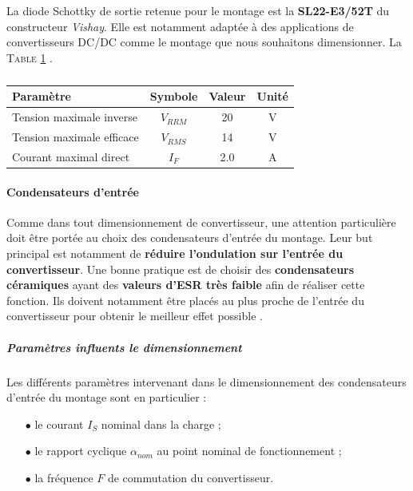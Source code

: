 				La diode Schottky de sortie retenue pour le montage est la 
				\textbf{SL22-E3/52T} du constructeur \textit{Vishay}. 
				Elle est notamment adaptée à des applications de convertisseurs
				DC/DC comme le montage que nous souhaitons dimensionner. 
				La \textsc{Table \ref{charact_schottky}} \cite{SL22}.
					
				\begin{table}
					\begin{center}
						\begin{tabular}{|l|c|c|c}
							\hline
							Paramètre & Symbole & Valeur & Unité \\
							\hline						
							Tension maximale inverse & $V_{RRM}$ & 20 & V \\
							\hline						
							Tension maximale efficace & $V_{RMS}$ & 14 & V \\
							\hline						
							Courant maximal direct & $I_{F}$ & 2.0 & A \\
							\hline						
						\end{tabular}					
					\end{center}
					\caption{}
					\label{charact_schottky}
				\end{table}
				
				\paragraph{Condensateurs d'entrée}
					
				Comme dans tout dimensionnement de convertisseur, une attention 
				particulière doit être portée au choix des condensateurs d'entrée
				du montage. Leur but principal est notamment de 
				\textbf{réduire l'ondulation sur l'entrée du convertisseur}. 
				Une bonne pratique est de choisir des 
				\textbf{condensateurs céramiques} ayant des 
				\textbf{valeurs d'ESR très faible} afin de réaliser cette fonction. 
				Ils doivent notamment être placés au plus proche de l'entrée du 
				convertisseur pour obtenir le meilleur effet possible \cite{A055}.
								
					\subparagraph{Paramètres influents le dimensionnement}
					Les différents paramètres intervenant dans le dimensionnement des condensateurs d'entrée du montage sont en particulier :
						
						\begin{itemize}
							\item[$\bullet$] le courant $I_{S}$ nominal dans la charge ;
							\item[$\bullet$] le rapport cyclique  $\alpha_{nom}$ au point nominal de fonctionnement ;
							\item[$\bullet$] la fréquence $F$ de commutation du convertisseur.	
						\end{itemize}
						
